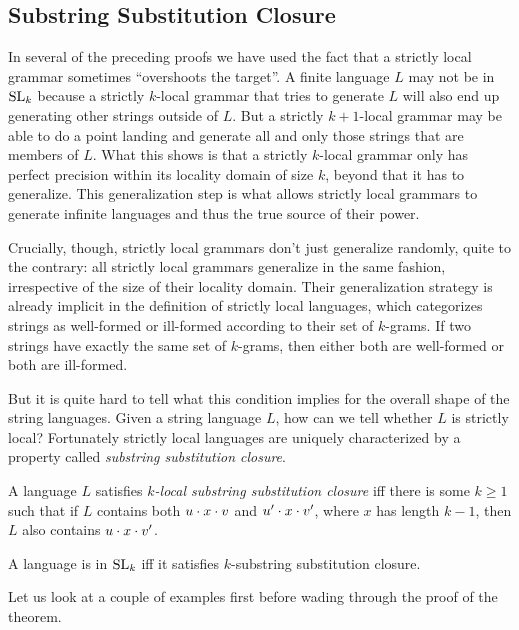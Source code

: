 \subsection{Substring Substitution Closure}

In several of the preceding proofs we have used the fact that a strictly local grammar sometimes ``overshoots the target''.
A finite language $L$ may not be in $\mathrm{SL}_k$ because a strictly $k$-local grammar that tries to generate $L$ will also end up generating other strings outside of $L$.
But a strictly $k+1$-local grammar may be able to do a point landing and generate all and only those strings that are members of $L$.
What this shows is that a strictly $k$-local grammar only has perfect precision within its locality domain of size $k$, beyond that it has to generalize.
This generalization step is what allows strictly local grammars to generate infinite languages and thus the true source of their power.

Crucially, though, strictly local grammars don't just generalize randomly, quite to the contrary: all strictly local grammars generalize in the same fashion, irrespective of the size of their locality domain.
Their generalization strategy is already implicit in the definition of strictly local languages, which categorizes strings as well-formed or ill-formed according to their set of $k$-grams.
If two strings have exactly the same set of $k$-grams, then either both are well-formed or both are ill-formed.

But it is quite hard to tell what this condition implies for the overall shape of the string languages.
Given a string language $L$, how can we tell whether $L$ is strictly local?
Fortunately strictly local languages are uniquely characterized by a property called \emph{substring substitution closure}.
%
\begin{definition}
    A language $L$ satisfies \emph{$k$-local substring substitution closure} iff there is some $k \geq 1$ such that if $L$ contains both $u \cdot x \cdot v$ and $u' \cdot x \cdot v'$, where $x$ has length $k - 1$, then $L$ also contains $u \cdot x \cdot v'$.
\end{definition}
%
\begin{theorem}
    A language is in $\mathrm{SL}_k$ iff it satisfies $k$-substring substitution closure.
\end{theorem}
%
Let us look at a couple of examples first before wading through the proof of the theorem.

